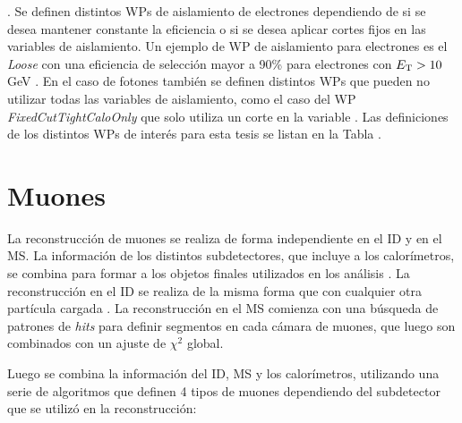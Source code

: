 . Se definen distintos WPs de aislamiento de electrones dependiendo de si se desea mantener constante la eficiencia o si se desea aplicar cortes fijos en las variables de aislamiento. Un ejemplo de WP de aislamiento para electrones es el \textit{Loose} con una eficiencia de selección mayor a 90\% para electrones con $E_{\text{T}}>10$ GeV \cite{EGAM-2018-01}. En el caso de fotones también se definen distintos WPs que pueden no utilizar todas las variables de aislamiento, como el caso del WP \textit{FixedCutTightCaloOnly} que solo utiliza un corte en la variable \ETcone. Las definiciones de los distintos WPs de interés para esta tesis se listan en la Tabla .









\section{Muones}


La reconstrucción de muones se realiza de forma independiente en el ID y en el MS. La información de los distintos subdetectores, que incluye a los calorímetros, se combina para formar a los objetos finales utilizados en los análisis \cite{PERF-2015-10}. La reconstrucción en el ID se realiza de la misma forma que con cualquier otra partícula cargada \cite{newt, silicon}. La reconstrucción en el MS comienza con una búsqueda de patrones de \textit{hits}  para definir segmentos en cada cámara de muones, que luego son combinados con un ajuste de $\chi^2$ global.

Luego se combina la información del ID, MS y los calorímetros, utilizando una serie de algoritmos que definen 4 tipos de muones dependiendo del subdetector que se utilizó en la reconstrucción:

